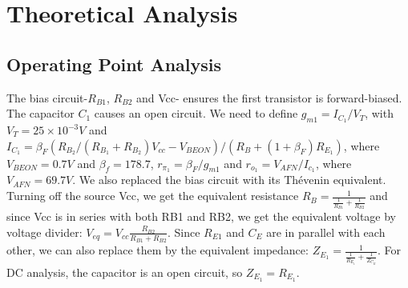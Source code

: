 \section{Theoretical Analysis}
\label{sec:octave}

\subsection{Operating Point Analysis}
The bias circuit-$R_{B1}$, $R_{B2}$ and Vcc- ensures the first transistor is forward-biased. The capacitor $C_1$ causes an open circuit.
We need to define $g_{m1}=I_{C_1}/V_T$, with $V_T=25 \times 10^{-3} V$ and $I_{C_1}=\beta_F (R_{B_2}/(R_{B_1}+R_{B_2})V_{cc} -V_{BEON})/(R_B+(1+\beta_F)R_{E_1})$, where $V_{BEON}=0.7 V$ and $\beta_f=178.7$, $r_{\pi_1}=\beta_F/g_{m1}$ and $r_{o_1}=V_{AFN}/I_{c_1}$, where $V_{AFN}=69.7 V$.
We also replaced the bias circuit with its Thévenin equivalent. Turning off the source Vcc, we get the equivalent resistance $R_B= \frac{1}{\frac{1}{R_{B1}}+\frac{1}{R_{B2}}}$ and since Vcc is in series with both RB1 and RB2, we get the equivalent voltage by voltage divider: $V_{eq}=V_{cc}\frac{R_{B2}}{R_{B1}+R_{B2}}$.
Since $R_{E1}$ and $C_E$ are in parallel with each other, we can also replace them by the equivalent impedance: $Z_{E_1}=\frac{1}{\frac{1}{R_{E_1}}+\frac{1}{Z_{C_E}}}$. For DC analysis, the capacitor is an open circuit, so $Z_{E_1}=R_{E_1}$.

